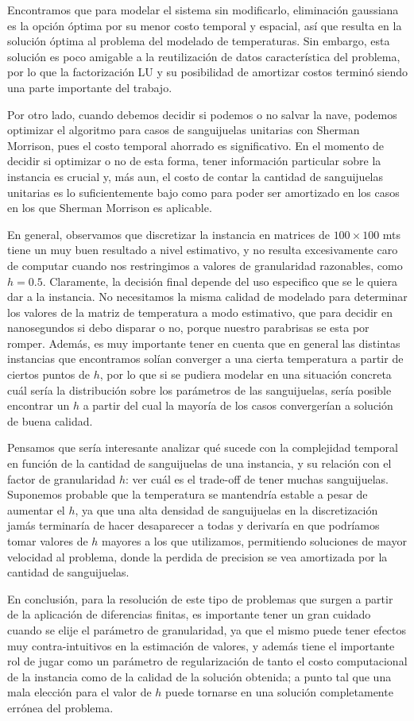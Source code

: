 Encontramos que para modelar el sistema sin modificarlo, eliminación gaussiana es la opción óptima por su menor costo temporal y espacial, así que resulta en la solución óptima al problema del modelado de temperaturas. Sin embargo, esta solución es poco amigable a la reutilización de datos característica del problema, por lo que la factorización LU y su posibilidad de amortizar costos terminó siendo una parte importante del trabajo.

Por otro lado, cuando debemos decidir si podemos o no salvar la nave, podemos optimizar el algoritmo para casos de sanguijuelas unitarias con Sherman Morrison, pues el costo temporal ahorrado es significativo. En el momento de decidir si optimizar o no de esta forma, tener información particular sobre la instancia es crucial y, más aun, el costo de contar la cantidad de sanguijuelas unitarias es lo suficientemente bajo como para poder ser amortizado en los casos en los que Sherman Morrison es aplicable.

En general, observamos que discretizar la instancia en matrices de $100 \times 100$ mts tiene un muy buen resultado a nivel estimativo, y no resulta excesivamente caro de computar cuando nos restringimos a valores de granularidad razonables, como $h = 0.5$. Claramente, la decisión final depende del uso especifico que se le quiera dar a la instancia. No necesitamos la misma calidad de modelado para determinar los valores de la matriz de temperatura a modo estimativo, que para decidir en nanosegundos si debo disparar o no, porque nuestro parabrisas se esta por romper. Además, es muy importante tener en cuenta que en general las distintas instancias que encontramos solían converger a una cierta temperatura a partir de ciertos puntos de $h$, por lo que si se pudiera modelar en una situación concreta cuál sería la distribución sobre los parámetros de las sanguijuelas, sería posible encontrar un $h$ a partir del cual la mayoría de los casos convergerían a solución de buena calidad.

Pensamos que sería interesante analizar qué sucede con la complejidad temporal en función de la cantidad de sanguijuelas de una instancia, y su relación con el factor de granularidad $h$: ver cuál es el trade-off de tener muchas sanguijuelas. Suponemos probable que la temperatura se mantendría estable a pesar de aumentar el $h$, ya que una alta densidad de sanguijuelas en la discretización jamás terminaría de hacer desaparecer a todas y derivaría en que podríamos tomar valores de $h$ mayores a los que utilizamos, permitiendo soluciones de mayor velocidad al problema, donde la perdida de precision se vea amortizada por la cantidad de sanguijuelas.

En conclusión, para la resolución de este tipo de problemas que surgen a partir de la aplicación de diferencias finitas, es importante tener un gran cuidado cuando se elije el parámetro de granularidad, ya que el mismo puede tener efectos muy contra-intuitivos en la estimación de valores, y además tiene el importante rol de jugar como un parámetro de regularización de tanto el costo computacional de la instancia como de la calidad de la solución obtenida; a punto tal que una mala elección para el valor de $h$ puede tornarse en una solución completamente errónea del problema.
